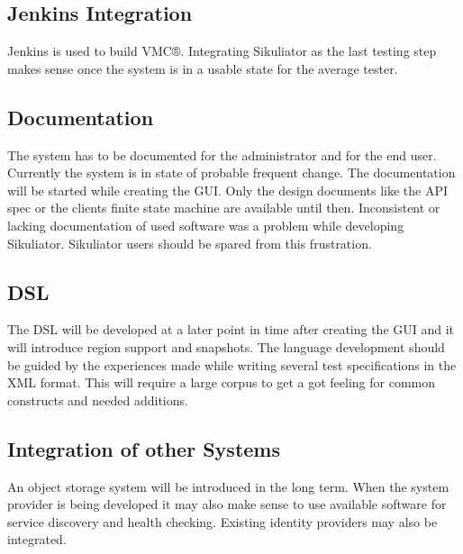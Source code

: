 \documentclass[a4paper,twocolumn,twoside]{article}
\newcommand{\VMC}[0]{VMC®}
\newcommand{\Sik}[0]{Sikuliator}
\begin{document}
\subsection*{Jenkins Integration}
Jenkins is used to build \VMC{}.
Integrating \Sik{} as the last testing step makes sense once the system is in a usable state for the average tester.

\subsection*{Documentation}
The system has to be documented for the administrator and for the end user.
Currently the system is in state of probable frequent change.
The documentation will be started while creating the GUI. 
Only the design documents like the API spec or the clients finite state machine are available until then.
Inconsistent or lacking documentation of used software was a problem while developing \Sik{}.
\Sik{} users should be spared from this frustration.

\subsection*{DSL}
The DSL will be developed at a later point in time after creating the GUI and it will introduce region support and snapshots.
The language development should be guided by the experiences made while writing several test specifications in the XML format.
This will require a large corpus to get a got feeling for common constructs and needed additions.

\subsection*{Integration of other Systems}
An object storage system will be introduced in the long term.
When the system provider is being developed it may also make sense to use available software for service discovery and health checking.
Existing identity providers may also be integrated.


\printbibliography[notkeyword=software,resetnumbers=true,prefixnumbers=R]
\printbibliography[keyword=used,title={Used software},resetnumbers=true,prefixnumbers=US]
\printbibliography[notkeyword=used,keyword=software,title={Other software},resetnumbers=true,prefixnumbers=OS]
\end{document}
